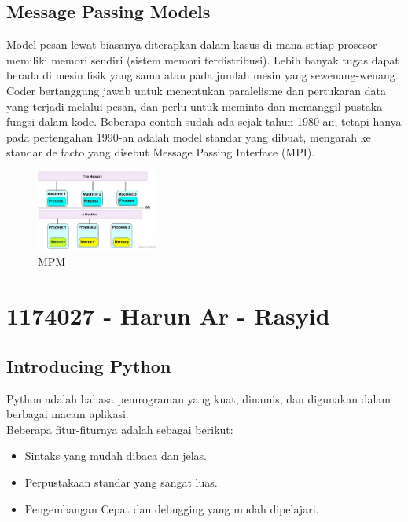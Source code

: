 \subsection{Message Passing Models}
\hfill\break
Model pesan lewat biasanya diterapkan dalam kasus di mana setiap prosesor memiliki memori sendiri (sistem memori terdistribusi). Lebih banyak tugas dapat berada di mesin fisik yang sama atau pada jumlah mesin yang sewenang-wenang. Coder bertanggung jawab untuk menentukan paralelisme dan pertukaran data yang terjadi melalui pesan, dan perlu untuk meminta dan memanggil pustaka fungsi dalam kode. Beberapa contoh sudah ada sejak tahun 1980-an, tetapi hanya pada pertengahan 1990-an adalah model standar yang dibuat, mengarah ke standar de facto yang disebut Message Passing Interface (MPI).
 \begin{figure}[H]
        \includegraphics[width=4cm]{figures/kelompok3/1/dwi4.PNG}
        \centering
        \caption{MPM}
\end{figure}


\section{1174027 - Harun Ar - Rasyid}
\subsection{Introducing Python}
\hfill\break
Python adalah bahasa pemrograman yang kuat, dinamis, dan digunakan dalam berbagai macam aplikasi. \\
Beberapa fitur-fiturnya adalah sebagai berikut:
\begin{itemize}
    \item Sintaks yang mudah dibaca dan jelas.
    \item Perpustakaan standar yang sangat luas.
    \item Pengembangan Cepat dan debugging yang mudah dipelajari.
\end{itemize}
